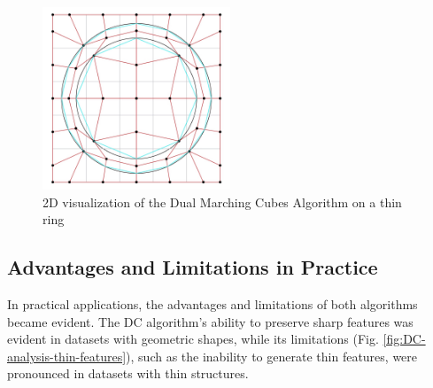 \begin{figure}[H]
\centering
\includegraphics[width=0.5\textwidth]{Figures/DMC-dual-grid.jpg}
\decoRule
\caption{2D visualization of the Dual Marching Cubes Algorithm on a thin ring}
\label{fig:DMC-dual-grid-ex-ch6}
\end{figure}

\subsection{Advantages and Limitations in Practice}

In practical applications, the advantages and limitations of both algorithms became evident. The DC algorithm's ability to preserve sharp features was evident in datasets with geometric shapes, while its limitations (Fig. \ref{fig:DC-analysis-thin-features}), such as the inability to generate thin features, were pronounced in datasets with thin structures.

